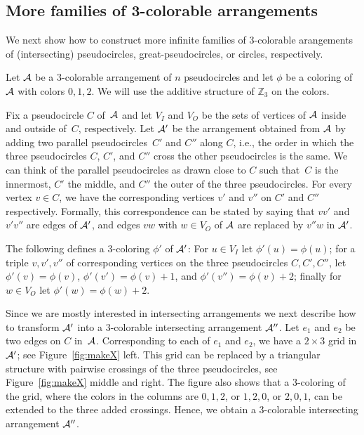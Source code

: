 \documentclass[fontsize=11pt,a4paper,DIV12]{scrartcl}
\def\AA{{\cal A}}
\def\ZZ{\mathbb{Z}}
\begin{document}
\subsection{More families of 3-colorable arrangements}
\label{sec:another_construction}

We next show how to construct more infinite families of 3-colorable arangements of 
(intersecting) pseudocircles, great-pseudocircles, or circles, respectively.

Let $\AA$ be a 3-colorable arrangement of $n$ pseudocircles
and let $\phi$ be a coloring of $\AA$ with colors $0,1,2$.
We will use the additive structure of $\ZZ_3$ on the colors.

Fix a pseudocircle $C$ of~$\AA$ and let $V_I$ and $V_O$ be the sets of vertices
of $\AA$ inside and outside of~$C$, respectively.  Let $\AA'$ be the
arrangement obtained from $\AA$ by adding two parallel pseudocircles~$C'$ and
$C''$ along $C$, i.e., the order in which the three pseudocircles $C$, $C'$, and
$C''$ cross the other pseudocircles is the same. We can think of the parallel pseudocircles
as drawn close to $C$ such that~$C$ is the innermost, $C'$ the middle, and
$C''$ the outer of the three pseudocircles. For every vertex $v\in C$, we have the
corresponding vertices $v'$ and $v''$ on $C'$ and $C''$ respectively.
Formally, this correspondence can be stated by saying that $vv'$ and $v'v''$ are edges of $\AA'$, and edges $vw$ with $w\in V_O$ of $\AA$ are replaced by $v''w$ in $\AA'$.

The following defines a 3-coloring $\phi'$ of $\AA'$: 
For $u \in V_I$ let
$\phi'(u) = \phi(u)$; for a triple $v,v',v''$ of corresponding vertices on the
three pseudocircles $C,C',C''$, let $\phi'(v) = \phi(v)$,  $\phi'(v') = \phi(v)+1$, and
$\phi'(v'') = \phi(v)+2$; finally for $w \in V_O$ let $\phi'(w) = \phi(w)+2$.

Since we are mostly interested in intersecting arrangements we next describe
how to transform $\AA'$ into a 3-colorable intersecting arrangement $\AA''$.
Let $e_1$ and $e_2$ be two edges on $C$ in~$\AA$. Corresponding to each of
$e_1$ and $e_2$, we have a  $2\times 3$ grid in $\AA'$; see Figure~\ref{fig:makeX} left. 
This grid can be replaced by a triangular structure with pairwise
crossings of the three pseudocircles, see Figure~\ref{fig:makeX} middle and
right. 
The figure also shows that a 3-coloring of the grid, where the
colors in the columns are $0,1,2$, or $1,2,0$, or $2,0,1$, can be extended to
the three added crossings.  Hence, we obtain a 3-colorable intersecting
arrangement $\AA''$.
\end{document}
